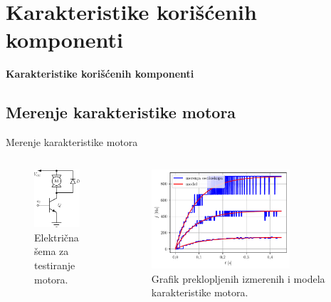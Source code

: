 \documentclass[aspectratio=169,xcolor=dvipsnames]{beamer}
\begin{document}

\section{Karakteristike korišćenih komponenti}

\begin{frame}
    \Huge{\centerline{\textbf{Karakteristike korišćenih komponenti}}}
\end{frame}

\subsection{Merenje karakteristike motora}

\begin{frame}{Merenje karakteristike motora}
	\begin{columns}[c]
    \begin{column}{.4\textwidth}
    \begin{figure}
        \centering
        \includegraphics[scale = 0.75]{fig/DCtransistor.pdf}
        \caption{Električna šema za testiranje motora.}
    \end{figure}      
    \end{column}
    \begin{column}{.6\textwidth}
    \begin{figure}
        \centering
        \includegraphics[width=0.75\textwidth]{fig/compact.pdf}
        \caption{Grafik preklopljenih izmerenih i modela karakteristike motora.}
    \end{figure}
    \end{column}
\end{columns}
\end{frame}
\end{document}
